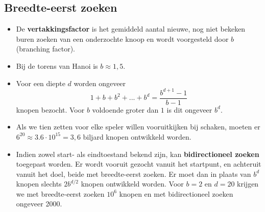 \subsection{Breedte-eerst zoeken}
\begin{itemize}
	\item De \textbf{vertakkingsfactor} is het gemiddeld aantal nieuwe, nog niet bekeken buren zoeken van een onderzochte knoop en wordt voorgesteld door $b$ (branching factor).
	\item Bij de torens van Hanoi is $b \approx 1,5$.
	\item Voor een diepte $d$ worden ongeveer 
	$$1 + b + b^2 + ... + b^d = \frac{b^{d + 1} - 1}{b - 1}$$
	knopen bezocht. Voor $b$ voldoende groter dan $1$ is dit ongeveer $b^d$.
	\item Als we tien zetten voor elke speler willen vooruitkijken bij schaken, moeten er $6^{20} \approx 3.6\cdot10^{15} = 3,6$ biljard knopen ontwikkeld worden.
	\item Indien zowel start- als eindtoestand bekend zijn, kan \textbf{bidirectioneel zoeken} toegepast worden. Er wordt vooruit gezocht vanuit het startpunt, en achteruit vanuit het doel, beide met breedte-eerst zoeken. Er moet dan in plaats van $b^d$ knopen slechts $2b^{d/2}$ knopen ontwikkeld worden. Voor $b = 2$ en $d = 20$ krijgen we met breedte-eerst zoeken $10^6$ knopen en met bidirectioneel zoeken ongeveer 2000.
\end{itemize}
